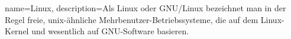 {
  name=Linux,
  description={Als Linux oder GNU/Linux bezeichnet man in der Regel freie, unix-ähnliche Mehrbenutzer-Betriebssysteme, die auf dem Linux-Kernel und wesentlich auf GNU-Software basieren.}
}

